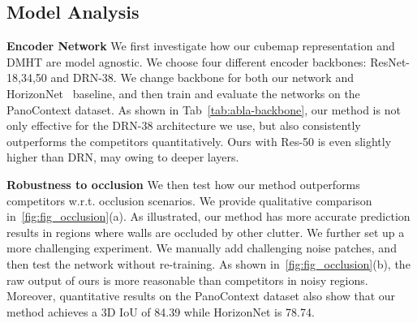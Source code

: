 \documentclass[runningheads]{llncs}
\begin{document}
\subsection{Model Analysis}
\noindent\textbf{Encoder Network}
We first investigate how our cubemap representation and DMHT are model agnostic. We choose four different encoder backbones: ResNet-18,34,50\cite{He_2016_ResNet} and DRN-38\cite{yu2017dilated}.
We change backbone for both our network and HorizonNet~\cite{sun2019horizonnet} baseline, and then train and evaluate the networks on the PanoContext dataset.
As shown in Tab~\ref{tab:abla-backbone}, our method is not only effective for the DRN-38 architecture we use, but also consistently outperforms the competitors quantitatively. Ours with Res-50 is even slightly higher than DRN, may owing to deeper layers.

\begin{table}[!h]
\centering
{}
\caption{Model analysis of the model agnostic generalization capability of DMH-Net on the PanoContext dataset. (Bold and underline indicates better than other competitors and the best among all, respectively.) Our DMH-Net consistently outperforms the competitors quantitatively when changing different backbones.}
\label{tab:abla-backbone}
\end{table}

\noindent\textbf{Robustness to occlusion}
We then test how our method outperforms competitors w.r.t. occlusion scenarios.
We provide qualitative comparison in~\cref{fig:fig_occlusion}(a). 
As illustrated, our method has more accurate prediction results in regions where walls are occluded by other clutter.
We further set up a more challenging experiment. We manually add challenging noise patches, and then test the network without re-training. 
As shown in~\cref{fig:fig_occlusion}(b), the raw output of ours is more reasonable than competitors in noisy regions.
Moreover, quantitative results on the PanoContext dataset also show that our method achieves a 3D IoU of 84.39 while HorizonNet is 78.74.
\end{document}
